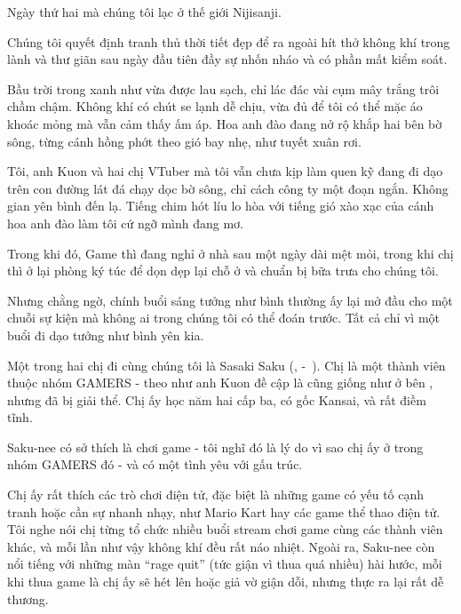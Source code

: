 \documentclass[../main.tex]{subfiles}
\begin{document}

Ngày thứ hai mà chúng tôi lạc ở thế giới Nijisanji.

Chúng tôi quyết định tranh thủ thời tiết đẹp để ra ngoài hít thở không khí trong lành và thư giãn sau ngày đầu tiên đầy sự nhốn nháo và có phần mất kiểm soát.

Bầu trời trong xanh như vừa được lau sạch, chỉ lác đác vài cụm mây trắng trôi chầm chậm. Không khí có chút se lạnh dễ chịu, vừa đủ để tôi có thể mặc áo khoác mỏng mà vẫn cảm thấy ấm áp. Hoa anh đào đang nở rộ khắp hai bên bờ sông, từng cánh hồng phớt theo gió bay nhẹ, như tuyết xuân rơi.

Tôi, anh Kuon và hai chị VTuber mà tôi vẫn chưa kịp làm quen kỹ đang đi dạo trên con đường lát đá chạy dọc bờ sông, chỉ cách công ty một đoạn ngắn. Không gian yên bình đến lạ. Tiếng chim hót líu lo hòa với tiếng gió xào xạc của cánh hoa anh đào làm tôi cứ ngỡ mình đang mơ.

Trong khi đó, Game thì đang nghỉ ở nhà sau một ngày dài mệt mỏi, trong khi chị thì ở lại phòng ký túc để dọn dẹp lại chỗ ở và chuẩn bị bữa trưa cho chúng tôi.

Nhưng chằng ngờ, chính buổi sáng tưởng như bình thường ấy lại mở đầu cho một chuỗi sự kiện mà không ai trong chúng tôi có thể đoán trước. Tất cả chỉ vì một buổi đi dạo tưởng như bình yên kia.


\chrint


Một trong hai chị đi cùng chúng tôi là Sasaki Saku (, -\ ). Chị là một thành viên thuộc nhóm GAMERS - theo như anh Kuon đề cập là cũng giống như ở bên \hll, nhưng đã bị giải thể. Chị ấy học năm hai cấp ba, có gốc Kansai, và rất điềm tĩnh.

Saku-nee có sở thích là chơi game - tôi nghĩ đó là lý do vì sao chị ấy ở trong nhóm GAMERS đó - và có một tình yêu với gấu trúc.

Chị ấy rất thích các trò chơi điện tử, đặc biệt là những game có yếu tố cạnh tranh hoặc cần sự nhanh nhạy, như Mario Kart hay các game thể thao điện tử. Tôi nghe nói chị từng tổ chức nhiều buổi stream chơi game cùng các thành viên khác, và mỗi lần như vậy không khí đều rất náo nhiệt. Ngoài ra, Saku-nee còn nổi tiếng với những màn ``rage quit'' (tức giận vì thua quá nhiều) hài hước, mỗi khi thua game là chị ấy sẽ hét lên hoặc giả vờ giận dỗi, nhưng thực ra lại rất dễ thương.
\end{document}
